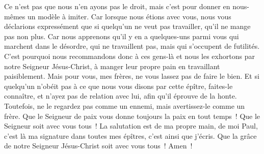 \begin{multicols}{2}
Ce n'est pas que nous n'en ayons pas le droit, mais c'est pour donner en nous-mêmes un modèle à imiter.
Car lorsque nous étions avec vous, nous vous déclarions expressément que si quelqu'un ne veut pas travailler, qu'il ne mange pas non plus.
Car nous apprenons qu'il y en a quelques-uns parmi vous qui marchent dans le désordre, qui ne travaillent pas, mais qui s'occupent de futilités.
C'est pourquoi nous recommandons donc à ces gens-là et nous les exhortons par notre Seigneur Jésus-Christ, à manger leur propre pain en travaillant paisiblement.
Mais pour vous, mes frères, ne vous lassez pas de faire le bien.
Et si quelqu'un n'obéit pas à ce que nous vous disons par cette épître, faites-le connaître, et n'ayez pas de relation avec lui, afin qu'il éprouve de la honte.
Toutefois, ne le regardez pas comme un ennemi, mais avertissez-le comme un frère.
Que le Seigneur de paix vous donne toujours la paix en tout temps~! Que le Seigneur soit avec vous tous~!
La salutation est de ma propre main, de moi Paul, c'est là ma signature dans toutes mes épîtres, c'est ainsi que j'écris.
Que la grâce de notre Seigneur Jésus-Christ soit avec vous tous~! Amen~!
\PPE{}
\end{multicols}
